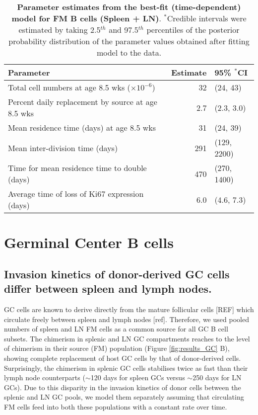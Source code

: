 \documentclass[11pt]{article}
\begin{document}
	
	\begin{table}[h!]
		\begin{center}
			\renewcommand{\arraystretch}{1.25}
			\begin{tabular}{ l r l } 
				\toprule 
				\textbf{Parameter}  &  {\small Estimate}  &  {\small 95\%  $^{\ast}$CI} \\ 
				\toprule
				Total cell numbers at age 8.5 wks ($\times 10^{-6}$)      & 32       &  (24, 43)  \\ 
				Percent daily replacement by source at age 8.5 wks        & 2.7      &  (2.3, 3.0)  \\
				Mean residence time (days) at age 8.5 wks                 & 31       &  (24, 39)  \\ 
				Mean inter-division time (days)                           & 291      &  (129, 2200)  \\
				Time for mean residence time to double (days)             & 470      &  (270, 1400)  \\
				Average time of loss of Ki67 expression (days)            & 6.0      &  (4.6, 7.3)  \\
				\hline
				\toprule 
			\end{tabular}
		\end{center}
		\caption{\small \textbf{Parameter estimates from the best-fit (time-dependent) model for FM B cells (Spleen + LN)}. $^{\ast}$Credible intervals were estimated by taking 2.5$^{th}$ and 97.5$^{th}$ percentiles of the posterior probability distribution of the parameter values obtained after fitting model to the data.}
		\label{tab:FM-parestm}
	\end{table} 
	
	\clearpage
	
	\section*{Germinal Center B cells}
	
	\subsection*{Invasion kinetics of donor-derived GC cells differ between spleen and lymph nodes.}
	GC cells are known to derive directly from the mature follicular cells [REF] which circulate freely between spleen and lymph nodes [ref].
	Therefore, we used pooled numbers of spleen and LN FM cells as a common source for all GC B cell subsets.
	The chimerism in splenic and LN GC compartments reaches to the level of chimerism in their source (FM) population (Figure \ref{fig:results_GC} B), showing complete replacement of host GC cells by that of donor-derived cells. 
	Surprisingly, the chimerism in splenic GC cells stabilises twice as fast than their lymph node counterparts ($\sim$120 days for spleen GCs versus $\sim$250 days for LN GCs). 
	Due to this  disparity in the invasion kinetics of donor cells between the splenic and LN GC pools, we model them separately assuming that circulating FM cells feed into both these populations with a constant rate over time. 
	
\end{document}
